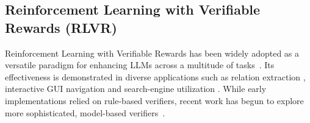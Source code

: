 \subsection{Reinforcement Learning with Verifiable Rewards (RLVR)} Reinforcement Learning with Verifiable Rewards has been widely adopted as a versatile paradigm for enhancing LLMs across a multitude of tasks~\citep{li2025self,DeepSeekAI2025DeepSeekR1IR,Shao2024DeepSeekMathPT}. Its effectiveness is demonstrated in diverse applications such as relation extraction \citep{dai2025r1}, interactive GUI navigation \citep{Shi2025MobileGUIRLAM} and search-engine utilization \citep{Jin2025SearchR1TL}. While early implementations relied on rule-based verifiers, recent work has begun to explore more sophisticated, model-based verifiers~\citep{Ma2025GeneralReasonerAL,li2025semanticallyawarerewardsopenendedr1,li2024fg}.